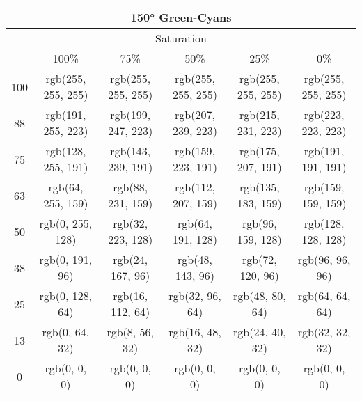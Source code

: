 \documentclass[a4j]{jarticle}
\begin{document}
\begin{tabular}{|c|c|c|c|c|c|}
\multicolumn{6}{|c|}{150°
 Green-Cyans}\\\hline\multicolumn{6}{|c|}{Saturation}\\\hline&100\%&75\%&50\%&25\%&0\%\\\hline100&rgb(255,
     255, 255)&rgb(255, 255, 255)&rgb(255, 255, 255)&rgb(255, 255,
                 255)&rgb(255, 255, 255)\\\hline88&rgb(191, 255,
     223)&rgb(199, 247, 223)&rgb(207, 239, 223)&rgb(215, 231,
                 223)&rgb(223, 223, 223)\\\hline75&rgb(128, 255,
     191)&rgb(143, 239, 191)&rgb(159, 223, 191)&rgb(175, 207,
                 191)&rgb(191, 191, 191)\\\hline63&rgb(64, 255,
     159)&rgb(88, 231, 159)&rgb(112, 207, 159)&rgb(135, 183,
                 159)&rgb(159, 159, 159)\\\hline50&rgb(0, 255,
     128)&rgb(32, 223, 128)&rgb(64, 191, 128)&rgb(96, 159, 128)&rgb(128,
                     128, 128)\\\hline38&rgb(0, 191, 96)&rgb(24, 167,
         96)&rgb(48, 143, 96)&rgb(72, 120, 96)&rgb(96, 96,
                     96)\\\hline25&rgb(0, 128, 64)&rgb(16, 112,
         64)&rgb(32, 96, 64)&rgb(48, 80, 64)&rgb(64, 64,
                     64)\\\hline13&rgb(0, 64, 32)&rgb(8, 56, 32)&rgb(16,
             48, 32)&rgb(24, 40, 32)&rgb(32, 32, 32)\\\hline0&rgb(0, 0,
     0)&rgb(0, 0, 0)&rgb(0, 0, 0)&rgb(0, 0, 0)&rgb(0, 0, 0) 
\end{tabular}
\end{document}
